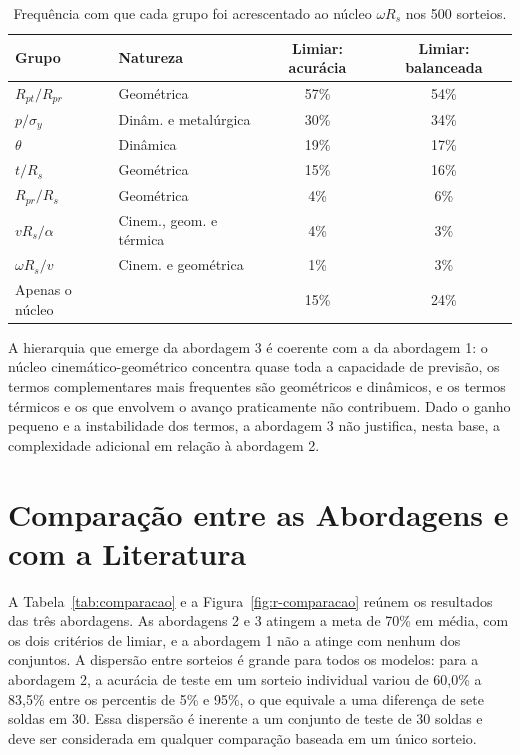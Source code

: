 \documentclass[12pt,openany]{report}
\begin{document}
\begin{table}[htbp]
\centering
\caption{Frequência com que cada grupo foi acrescentado ao núcleo $\omega R_s$ nos 500 sorteios.}
\label{tab:res_abord3}
\small
\begin{tabular}{llcc}
\toprule
\textbf{Grupo} & \textbf{Natureza} & \textbf{Limiar: acurácia} & \textbf{Limiar: balanceada} \\ \midrule
$R_{pt}/R_{pr}$ & Geométrica & 57\% & 54\% \\
$p/\sigma_y$ & Dinâm. e metalúrgica & 30\% & 34\% \\
$\theta$ & Dinâmica & 19\% & 17\% \\
$t/R_s$ & Geométrica & 15\% & 16\% \\
$R_{pr}/R_s$ & Geométrica & 4\% & 6\% \\
$vR_s/\alpha$ & Cinem., geom. e térmica & 4\% & 3\% \\
$\omega R_s/v$ & Cinem. e geométrica & 1\% & 3\% \\ \midrule
Apenas o núcleo & & 15\% & 24\% \\ \bottomrule
\end{tabular}
\end{table}

A hierarquia que emerge da abordagem 3 é coerente com a da abordagem 1: o núcleo cinemático-geométrico concentra quase toda a capacidade de previsão, os termos complementares mais frequentes são geométricos e dinâmicos, e os termos térmicos e os que envolvem o avanço praticamente não contribuem. Dado o ganho pequeno e a instabilidade dos termos, a abordagem 3 não justifica, nesta base, a complexidade adicional em relação à abordagem 2.

\section{Comparação entre as Abordagens e com a Literatura}
\label{sec:comparacao}

A Tabela~\ref{tab:comparacao} e a Figura~\ref{fig:r-comparacao} reúnem os resultados das três abordagens. As abordagens 2 e 3 atingem a meta de 70\% em média, com os dois critérios de limiar, e a abordagem 1 não a atinge com nenhum dos conjuntos. A dispersão entre sorteios é grande para todos os modelos: para a abordagem 2, a acurácia de teste em um sorteio individual variou de 60,0\% a 83,5\% entre os percentis de 5\% e 95\%, o que equivale a uma diferença de sete soldas em 30. Essa dispersão é inerente a um conjunto de teste de 30 soldas e deve ser considerada em qualquer comparação baseada em um único sorteio.
\end{document}
